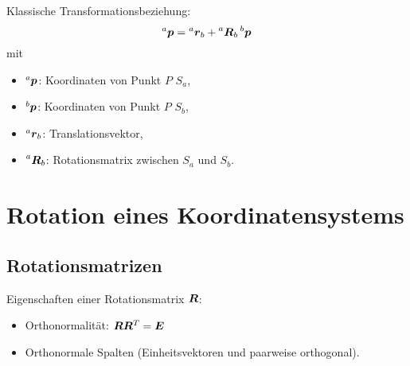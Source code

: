 		Klassische Transformationsbeziehung:
		\begin{equation*}
			\prescript{a}{}{\bm{p}} = \prescript{a}{}{\bm{r}}_b + \prescript{a}{}{\bm{R}}_b \prescript{b}{}{\bm{p}}
		\end{equation*}
		mit
		\begin{itemize}
			\item \( \prescript{a}{}{\bm{p}} \):   \tabto{1cm} Koordinaten von Punkt \(P\) \bzgl \(S_a\),
			\item \( \prescript{b}{}{\bm{p}} \):   \tabto{1cm} Koordinaten von Punkt \(P\) \bzgl \(S_b\),
			\item \( \prescript{a}{}{\bm{r}}_b \): \tabto{1cm} Translationsvektor,
			\item \( \prescript{a}{}{\bm{R}}_b \): \tabto{1cm} Rotationsmatrix zwischen \(S_a\) und \(S_b\).
		\end{itemize}

	\section{Rotation eines Koordinatensystems}
		\subsection{Rotationsmatrizen}
			Eigenschaften einer Rotationsmatrix \( \bm{R} \):
			\begin{itemize}
				\item Orthonormalität: \( \bm{R} \bm{R}^T = \bm{E} \)
				\item Orthonormale Spalten (\dh Einheitsvektoren und paarweise orthogonal).
			\end{itemize}

